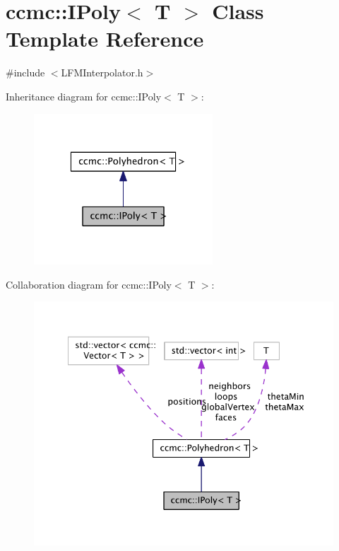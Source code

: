 \hypertarget{classccmc_1_1_i_poly}{\section{ccmc\-:\-:I\-Poly$<$ T $>$ Class Template Reference}
\label{classccmc_1_1_i_poly}
}


{\ttfamily \#include $<$L\-F\-M\-Interpolator.\-h$>$}



Inheritance diagram for ccmc\-:\-:I\-Poly$<$ T $>$\-:\nopagebreak
\begin{figure}[H]
\begin{center}
\leavevmode
\includegraphics[width=190pt]{classccmc_1_1_i_poly__inherit__graph}
\end{center}
\end{figure}


Collaboration diagram for ccmc\-:\-:I\-Poly$<$ T $>$\-:\nopagebreak
\begin{figure}[H]
\begin{center}
\leavevmode
\includegraphics[width=345pt]{classccmc_1_1_i_poly__coll__graph}
\end{center}
\end{figure}
